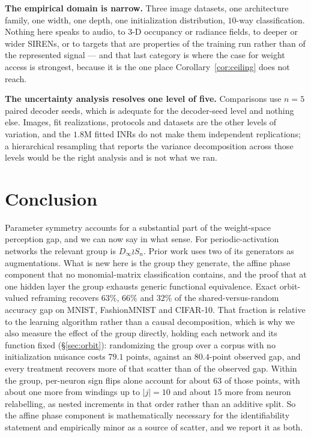 \documentclass[10pt,twocolumn,letterpaper]{article}
\theoremstyle{definition}
\newcommand{\Dinf}{D_\infty}
\begin{document}
\textbf{The empirical domain is narrow.} Three image datasets, one architecture family, one width,
one depth, one initialization distribution, $10$-way classification. Nothing here speaks to audio,
to 3-D occupancy or radiance fields, to deeper or wider SIRENs, or to targets that are properties of
the training run rather than of the represented signal --- and that last category is where the case
for weight access is strongest, because it is the one place Corollary~\ref{cor:ceiling} does not
reach.

\textbf{The uncertainty analysis resolves one level of five.} Comparisons use $n=5$ paired decoder
seeds, which is adequate for the decoder-seed level and nothing else. Images, fit realizations,
protocols and datasets are the other levels of variation, and the $1.8$M fitted INRs do not make
them independent replications; a hierarchical resampling that reports the variance decomposition
across those levels would be the right analysis and is not what we ran.

\section{Conclusion}

Parameter symmetry accounts for a substantial part of the weight-space perception gap, and we can now say in what sense. For periodic-activation networks the relevant group is $\Dinf\wr S_n$. Prior work uses two of its generators as augmentations. What is new here is the group they generate, the affine phase component that no monomial-matrix classification contains, and the proof that at one hidden layer the group exhausts generic functional equivalence. Exact orbit-valued reframing
recovers $63\%$, $66\%$ and $32\%$ of the shared-versus-random accuracy gap on MNIST, FashionMNIST
and CIFAR-10. That fraction is relative to the learning algorithm rather than a causal
decomposition, which is why we also measure the effect of the group directly, holding each network
and its function fixed (\S\ref{sec:orbit}): randomizing the group over a corpus with no
initialization nuisance costs $79.1$ points, against an $80.4$-point observed gap, and every
treatment recovers more of that scatter than of the observed gap. Within the group, per-neuron sign
flips alone account for about $63$ of those points, with about one more from windings up to $|j|=10$ and about $15$ more from neuron relabelling, as nested increments in that order rather than an additive split. So the affine phase component is mathematically necessary for the
identifiability statement and empirically minor as a source of scatter, and we report it as both.
\end{document}
